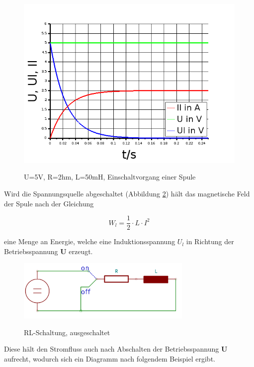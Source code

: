 {{\clearpage

\begin{figure}[H]
  \centering
      \includegraphics[width=\textwidth]{Graphics/SpuleLadekurve.png}
      \caption{U=5V, R=2hm, L=50mH, Einschaltvorgang einer Spule}{}
     \label{coil_on_diagram}
\end{figure}

\noindent Wird die Spannungsquelle abgeschaltet (Abbildung \ref{coil_off}) hält das magnetische Feld der Spule nach der Gleichung 

\begin{equation}
  W_l = \frac{1}{2} \cdot L \cdot I^2
  \label{eq:coilPower}
\end{equation}

\noindent eine Menge an Energie, welche eine Induktionsspannung \(U_l\) in Richtung der Betriebsspannung \textbf{U} erzeugt.

\begin{figure}[H]
  \centering
      \includegraphics[width=0.75\textwidth]{Graphics/RL_circuit_off.png}
      \caption{RL-Schaltung, ausgeschaltet}{}
     \label{coil_off}
\end{figure}

\noindent Diese hält den Stromfluss auch nach Abschalten der Betriebsspannung \textbf{U} aufrecht, wodurch sich ein Diagramm nach folgendem Beispiel ergibt.

}}
